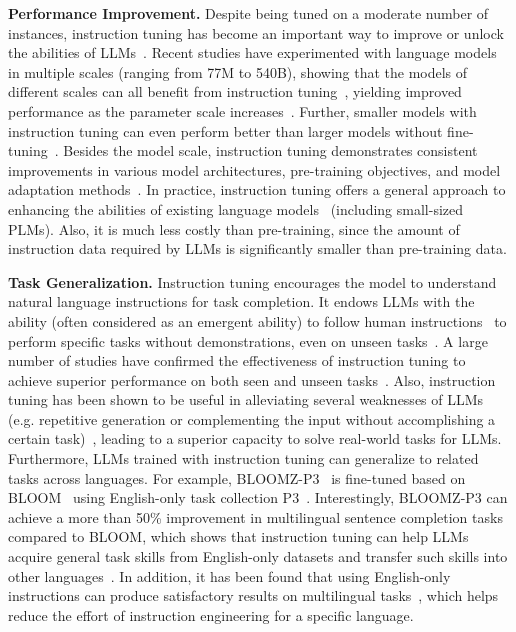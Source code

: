 \textbf{Performance Improvement.} Despite being tuned on a moderate  number of instances, instruction tuning has become an important way to improve or unlock the abilities of LLMs~\cite{Chung-arxiv-2022-Scaling}. Recent studies have experimented with language models in  multiple scales (ranging from  77M to 540B), showing that the models of different scales can all benefit from instruction tuning~\cite{Chung-arxiv-2022-Scaling,Longpre-arxiv-2023-The}, yielding improved performance as the parameter scale  increases~\cite{Muennighoff-2022-arxiv-Crosslingual}. Further, smaller models with instruction tuning can even perform better than larger models without fine-tuning~\cite{Sanh-ICLR-2022-Multitask,Chung-arxiv-2022-Scaling}. Besides the model scale, instruction tuning demonstrates consistent improvements in various model architectures, pre-training objectives, and model adaptation methods~\cite{Chung-arxiv-2022-Scaling}. In practice, instruction tuning offers {a general approach to enhancing the abilities of existing language models~\cite{Chung-arxiv-2022-Scaling} (including small-sized PLMs). Also, it is much less costly than pre-training, since the amount of  instruction data required by LLMs is significantly smaller than pre-training data.}   

\textbf{Task Generalization.} Instruction tuning encourages the model to understand natural language instructions for task completion. It endows LLMs with the ability (often considered as an emergent ability) to follow human instructions~\cite{Wei-arxiv-2022-Emergent} to perform specific tasks without demonstrations, even on unseen tasks~\cite{Chung-arxiv-2022-Scaling}. A large number of studies have confirmed the effectiveness of instruction tuning to achieve superior performance on both seen and unseen tasks~\cite{Iyer-arxiv-2022-OPT,Longpre-arxiv-2023-The}. Also, instruction tuning has been shown to be useful in alleviating several weaknesses of LLMs (e.g. repetitive generation or complementing the input without accomplishing a certain task)~\cite{Ouyang-arxiv-2022-Training,Chung-arxiv-2022-Scaling}, leading to a superior capacity to solve real-world tasks for LLMs. Furthermore, LLMs trained with instruction tuning can generalize to related tasks across languages. For example, BLOOMZ-P3~\cite{Muennighoff-2022-arxiv-Crosslingual} is fine-tuned based on BLOOM~\cite{Scao-arxiv-2022-BLOOM} using English-only task collection P3~\cite{Bach-ACL-2022-PromptSource}. Interestingly, BLOOMZ-P3 can achieve a more than 50\% improvement in multilingual sentence completion tasks compared to BLOOM, which shows that instruction tuning can help LLMs acquire general task skills from English-only datasets and transfer such skills into other languages~\cite{Muennighoff-2022-arxiv-Crosslingual}. In addition, it has been found  that using English-only instructions can produce satisfactory results on multilingual tasks~\cite{Muennighoff-2022-arxiv-Crosslingual}, which helps reduce the effort of instruction engineering for a specific language. 

